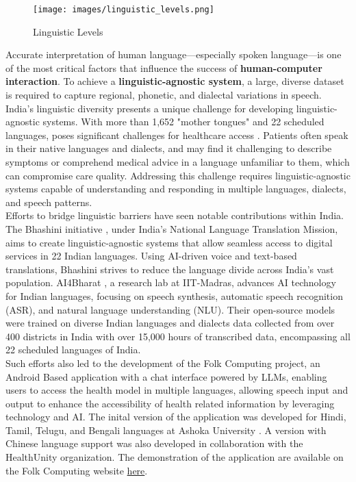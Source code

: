 \begin{figure}[H]
    \centering
    \texttt{[image: images/linguistic\_levels.png]}
    \caption{Linguistic Levels}
    \label{fig:linguistic_levels}
\end{figure}

\noindent Accurate interpretation of human language---especially spoken language---is one of the most critical factors that influence the success of \textcolor{TUMRed}{\textbf{human-computer interaction}}. To achieve a \textcolor{TUMRed}{\textbf{linguistic-agnostic system}}, a large, diverse dataset is required to capture regional, phonetic, and dialectal variations in speech.\\[\baselineskip]

\noindent India's linguistic diversity presents a unique challenge for developing linguistic-agnostic systems. With more than 1,652 "mother tongues" and 22 scheduled languages, poses significant challenges for healthcare access \cite{languagesIndia}. Patients often speak in their native languages and dialects, and may find it challenging to describe symptoms or comprehend medical advice in a language unfamiliar to them, which can compromise care quality. Addressing this challenge requires linguistic-agnostic systems capable of understanding and responding in multiple languages, dialects, and speech patterns.\\[\baselineskip]

\noindent Efforts to bridge linguistic barriers have seen notable contributions within India. The Bhashini initiative \cite{bhashini}, under India's National Language Translation Mission, aims to create linguistic-agnostic systems that allow seamless access to digital services in 22 Indian languages. Using AI-driven voice and text-based translations, Bhashini strives to reduce the language divide across India's vast population. AI4Bharat \cite{ai4bharat}, a research lab at IIT-Madras, advances AI technology for Indian languages, focusing on speech synthesis, automatic speech recognition (ASR), and natural language understanding (NLU). Their open-source models were trained on diverse Indian languages and dialects data collected from over 400 districts in India with over 15,000 hours of transcribed data, encompassing all 22 scheduled languages of India.\\[\baselineskip]

\noindent Such efforts also led to the development of the Folk Computing project, an Android Based application with a chat interface powered by LLMs, enabling users to access the health model in multiple languages, allowing speech input and output to enhance the accessibility of health related information by leveraging technology and AI. The inital version of the application was developed for Hindi, Tamil, Telugu, and Bengali languages at Ashoka University \cite{folkcomp}. A version with Chinese language support was also developed in collaboration with the HealthUnity organization. The demonstration of the application are available on the Folk Computing website \href{https://kutumlab.github.io/folk-comp/#demos}{here}.


